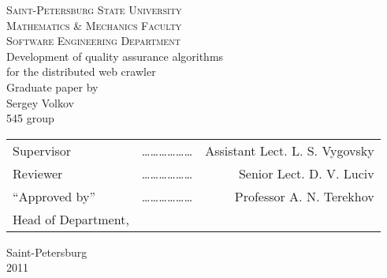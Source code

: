\documentclass[a4paper,10pt]{report}
\begin{document}
\begin{titlepage}
\begin{center}
\begin{otherlanguage}{english}

\textsc{Saint-Petersburg State University}\\
\textsc{Mathematics \& Mechanics Faculty}\\[1.0cm]

\textsc{Software Engineering Department}\\[3.0cm]

{ \LARGE Development of quality assurance algorithms}\\[1.0cm]

{ \LARGE for the distributed web crawler}\\[1.0cm]

{Graduate paper by \\ Sergey Volkov \\ 545 group}\\[3.0cm]

\begin{tabular}{lcr}
Supervisor & ……………… & Assistant Lect. L. S. Vygovsky \\[1.0cm]
Reviewer            & ……………… & Senior Lect. D. V. Luciv\\[1.0cm]
``Approved by'' & ……………… & Professor A. N. Terekhov\\
Head of Department, & & \\
\end{tabular}

\vfill

{\large Saint-Petersburg \\ 2011}

\end{otherlanguage}
\end{center}
\end{titlepage}

\tableofcontents






\end{document}
